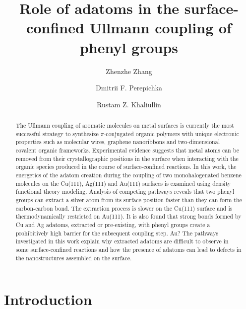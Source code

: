 \documentclass[aps,prb,reprint,amsmath,amssymb]{revtex4-1}
\newcommand{\comm}{\color{green}} %
\begin{document}
\title
{Role of adatoms in the surface-confined Ullmann coupling of phenyl groups}

\author{Zhenzhe Zhang}
\author{Dmitrii F. Perepichka}%
\author{Rustam Z. Khaliullin}
%


\begin{abstract}
\comm 
The Ullmann coupling of aromatic molecules on metal surfaces is currently the most successful strategy to synthesize $\pi$-conjugated organic polymers with unique electronic properties such as molecular wires, graphene nanoribbons and two-dimensional covalent organic frameworks. 
Experimental evidence suggests that metal atoms can be removed from their crystallographic positions in the surface when interacting with the organic species produced in the course of surface-confined reactions. In this work, the energetics of the adatom creation during the coupling of two monohalogenated benzene molecules on the Cu(111), Ag(111) and Au(111) surfaces is examined using density functional theory modeling. Analysis of competing pathways reveals that two phenyl groups can extract a silver atom from its surface position faster than they can form the carbon-carbon bond. The extraction process is slower on the Cu(111) surface and is  thermodynamically restricted on Au(111). It is also found that strong bonds formed by Cu and Ag adatoms, extracted or pre-existing, with phenyl groups create a prohibitively high barrier for the subsequent coupling step. 
%
Au?
%
The pathways investigated in this work explain why extracted adatoms are difficult to observe in some surface-confined reactions and how the presence of adatoms can lead to defects in the nanostructures assembled on the surface.
\end{abstract}

\maketitle


\section{Introduction}
\end{document}
